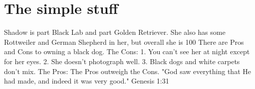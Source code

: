 \documentclass{article}
\title{}
\author{}
\date{}
\begin{document}
\section{The simple stuff}
Shadow is part Black Lab and part Golden Retriever. She also has some Rottweiler and German Shepherd in her, but overall she is 100%
 There are Pros and Cons to owning a black dog.
 The Cons:
 1. You can't see her at night except for her eyes.
2. She doesn't photograph well.
3. Black dogs and white carpets don't mix.
 The Pros:
     The Pros outweigh the Cons.
 "God saw everything that He had made, and indeed it was very good." Genesis 1:31  
\end{document}
